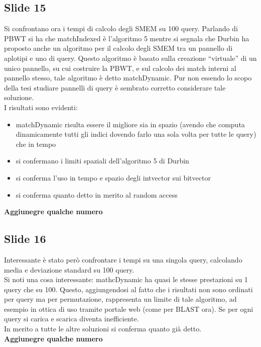 \documentclass[a4paper,11pt, oneside,italian]{article}
\begin{document}
\subsection*{Slide 15}
Si confrontano ora i tempi di calcolo degli SMEM su 100 query. Parlando di PBWT
si ha che matchIndexed è l'algoritmo 5 mentre si segnala
che Durbin ha proposto anche un algoritmo per il calcolo degli SMEM tra un
pannello di  aplotipi e uno di query. Questo algoritmo è basato sulla creazione
“virtuale” di un unico pannello, su cui costruire la PBWT, e sul calcolo dei
match interni al pannello stesso, tale algoritmo è detto matchDynamic. Pur non
essendo lo scopo della tesi studiare pannelli di query è sembrato corretto
considerare tale soluzione.\\
I risultati sono evidenti:
\begin{itemize}
  \item matchDynamic risulta essere il migliore sia in spazio (avendo che
  computa dinamicamente tutti gli indici dovendo farlo una sola volta per tutte
  le query) che in tempo
  \item si confermano i limiti spaziali dell'algoritmo 5 di Durbin
  \item si conferma l'uso in tempo e spazio degli intvector sui bitvector
  \item si conferma quanto detto in merito al random access
\end{itemize}
\textbf{Aggiunegre qualche numero}
\subsection*{Slide 16}
Interessante è stato però confrontare i tempi su una singola query, calcolando
media e deviazione standard su 100 query.\\
Si noti una cosa interessante: mathcDynamic ha quasi le stesse prestazioni su 1
query che su 100. Questo, aggiungendosi al fatto che i risultati non sono
ordinati per query ma per permutazione, rappresenta un limite di tale algoritmo,
ad esempio in ottica di uso tramite portale web (come per BLAST ora). Se per
ogni query si carica e scarica diventa inefficiente. \\
In merito a tutte le altre soluzioni si conferma quanto già detto.\\
\textbf{Aggiunegre qualche numero}
\end{document}

